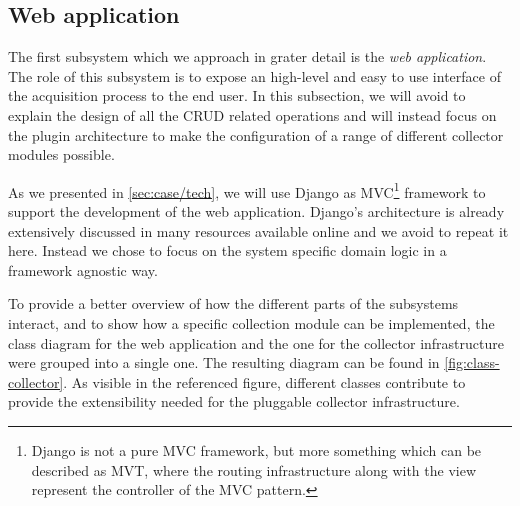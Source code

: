 \subsection{Web application}

The first subsystem which we approach in grater detail is the \emph{web application}. The role of this subsystem is to expose an high-level and easy to use interface of the acquisition process to the end user. In this subsection, we will avoid to explain the design of all the CRUD related operations and will instead focus on the plugin architecture to make the configuration of a range of different collector modules possible.

As we presented in \vref{sec:case/tech}, we will use Django as MVC\footnote{Django is not a pure MVC framework, but more something which can be described as MVT, where the routing infrastructure along with the view represent the controller of the MVC pattern.} framework to support the development of the web application. Django's architecture is already extensively discussed in many resources available online and we avoid to repeat it here. Instead we chose to focus on the system specific domain logic in a framework agnostic way.

To provide a better overview of how the different parts of the subsystems interact, and to show how a specific collection module can be implemented, the class diagram for the web application and the one for the collector infrastructure were grouped into a single one. The resulting diagram can be found in \vref{fig:class-collector}. As visible in the referenced figure, different classes contribute to provide the extensibility needed for the pluggable collector infrastructure.

